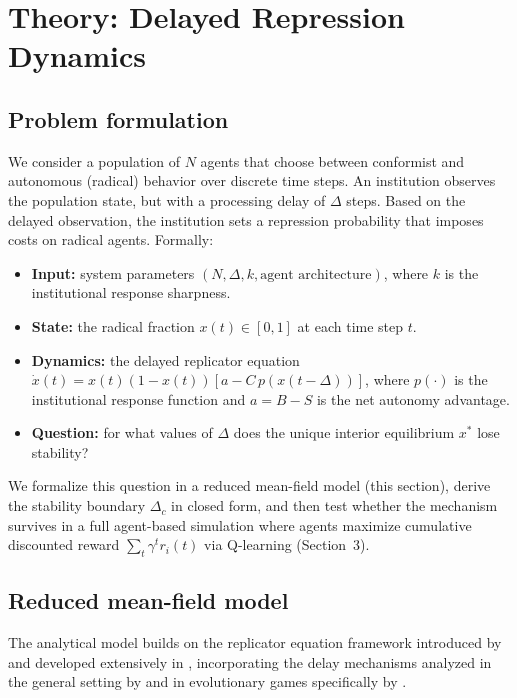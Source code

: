 \section{Theory: Delayed Repression Dynamics}

\subsection{Problem formulation}

We consider a population of $N$ agents that choose between conformist and autonomous (radical) behavior over discrete time steps. An institution observes the population state, but with a processing delay of $\Delta$ steps. Based on the delayed observation, the institution sets a repression probability that imposes costs on radical agents. Formally:
\begin{itemize}
\item \textbf{Input:} system parameters $(N, \Delta, k, \text{agent architecture})$, where $k$ is the institutional response sharpness.
\item \textbf{State:} the radical fraction $x(t) \in [0,1]$ at each time step $t$.
\item \textbf{Dynamics:} the delayed replicator equation $\dot{x}(t) = x(t)(1{-}x(t))[a - C\,p(x(t{-}\Delta))]$, where $p(\cdot)$ is the institutional response function and $a = B - S$ is the net autonomy advantage.
\item \textbf{Question:} for what values of $\Delta$ does the unique interior equilibrium $x^*$ lose stability?
\end{itemize}
We formalize this question in a reduced mean-field model (this section), derive the stability boundary $\Delta_c$ in closed form, and then test whether the mechanism survives in a full agent-based simulation where agents maximize cumulative discounted reward $\sum_{t} \gamma^t r_i(t)$ via Q-learning (Section~3).

\subsection{Reduced mean-field model}

The analytical model builds on the replicator equation framework introduced by \citet{taylor1978evolutionary} and developed extensively in \citet{hofbauer1998evolutionary}, incorporating the delay mechanisms analyzed in the general setting by \citet{kuang1993delay} and in evolutionary games specifically by \citet{wesson2016hopf}.


